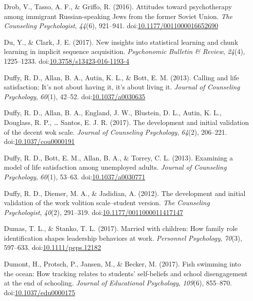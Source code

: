 \documentclass[english,man]{apa6}
\theoremstyle{definition}
\theoremstyle{definition}
\theoremstyle{definition}
\theoremstyle{remark}
\begin{document}
\hypertarget{ref-Drob2016}{}
Drob, V., Tasso, A. F., \& Griffo, R. (2016). Attitudes toward
psychotherapy among immigrant Russian-speaking Jews from the former
Soviet Union. \emph{The Counseling Psychologist}, \emph{44}(6),
921--941.
doi:\href{https://doi.org/10.1177/0011000016652690}{10.1177/0011000016652690}

\hypertarget{ref-Du2016}{}
Du, Y., \& Clark, J. E. (2017). New insights into statistical learning
and chunk learning in implicit sequence acquisition. \emph{Psychonomic
Bulletin \& Review}, \emph{24}(4), 1225--1233.
doi:\href{https://doi.org/10.3758/s13423-016-1193-4}{10.3758/s13423-016-1193-4}

\hypertarget{ref-Duffy2013a}{}
Duffy, R. D., Allan, B. A., Autin, K. L., \& Bott, E. M. (2013). Calling
and life satisfaction: It's not about having it, it's about living it.
\emph{Journal of Counseling Psychology}, \emph{60}(1), 42--52.
doi:\href{https://doi.org/10.1037/a0030635}{10.1037/a0030635}

\hypertarget{ref-Duffy2017}{}
Duffy, R. D., Allan, B. A., England, J. W., Blustein, D. L., Autin, K.
L., Douglass, R. P., \ldots{} Santos, E. J. R. (2017). The development
and initial validation of the decent wok scale. \emph{Journal of
Counseling Psychology}, \emph{64}(2), 206--221.
doi:\href{https://doi.org/10.1037/cou0000191}{10.1037/cou0000191}

\hypertarget{ref-Duffy2013}{}
Duffy, R. D., Bott, E. M., Allan, B. A., \& Torrey, C. L. (2013).
Examining a model of life satisfaction among unemployed adults.
\emph{Journal of Counseling Psychology}, \emph{60}(1), 53--63.
doi:\href{https://doi.org/10.1037/a0030771}{10.1037/a0030771}

\hypertarget{ref-Duffy2012}{}
Duffy, R. D., Diemer, M. A., \& Jadidian, A. (2012). The development and
initial validation of the work volition scale--student version.
\emph{The Counseling Psychologist}, \emph{40}(2), 291--319.
doi:\href{https://doi.org/10.1177/0011000011417147}{10.1177/0011000011417147}

\hypertarget{ref-Dumas2017}{}
Dumas, T. L., \& Stanko, T. L. (2017). Married with children: How family
role identification shapes leadership behaviors at work. \emph{Personnel
Psychology}, \emph{70}(3), 597--633.
doi:\href{https://doi.org/10.1111/peps.12182}{10.1111/peps.12182}

\hypertarget{ref-Dumont2017}{}
Dumont, H., Protsch, P., Jansen, M., \& Becker, M. (2017). Fish swimming
into the ocean: How tracking relates to students' self-beliefs and
school disengagement at the end of schooling. \emph{Journal of
Educational Psychology}, \emph{109}(6), 855--870.
doi:\href{https://doi.org/10.1037/edu0000175}{10.1037/edu0000175}
\end{document}
